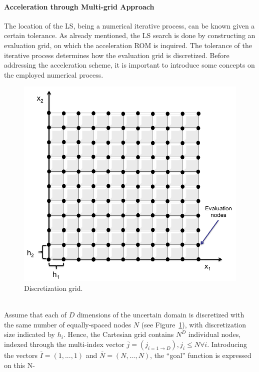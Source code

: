 \paragraph{Acceleration through Multi-grid Approach}
\label{par:LSaccelerationMultiGrid}
The location of the LS, being a numerical iterative process, can be 
known given a certain tolerance. As already mentioned, the LS search 
is done by constructing an evaluation grid, on which the acceleration 
ROM is inquired. The tolerance of the iterative process determines how 
the evaluation grid is discretized. Before addressing the acceleration 
scheme, it is important 
to introduce some concepts on the employed numerical process.
\begin{figure}[h!]
  \centering
  \includegraphics[width=1.0\textwidth]  {pics/DiscretizationGrid.png}
  \caption{Discretization grid.}
  \label{fig:DiscretizationGrid}
\end{figure}
\\Assume that each of $D$ dimensions of the uncertain domain is 
discretized with the same number of equally-spaced nodes $N$ (see 
Figure~\ref{fig:DiscretizationGrid}), with discretization size indicated 
by $h_{i}$. Hence, the Cartesian grid contains $N^{D}$ individual 
nodes, indexed through the multi-index vector $\overline{j} = \left ( 
j_{i=1\rightarrow D} \right ), j_{i} \leq N \forall i$. Introducing the 
vectors  $\overline{I} = (1, ..., 1)$ and
$\overline{N} = (N, ..., N)$, the ``goal'' function is expressed on this N-
